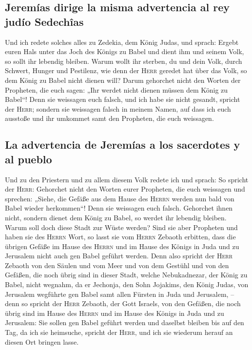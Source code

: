 \hypertarget{jeremuxedas-dirige-la-misma-advertencia-al-rey-juduxedo-sedechuxeeas}{%
\subsection{Jeremías dirige la misma advertencia al rey judío
Sedechîas}\label{jeremuxedas-dirige-la-misma-advertencia-al-rey-juduxedo-sedechuxeeas}}

 Und ich redete solches alles zu Zedekia, dem König
Judas, und sprach: Ergebt euren Hals unter das Joch des Königs zu Babel
und dient ihm und seinem Volk, so sollt ihr lebendig bleiben.
 Warum wollt ihr sterben, du und dein Volk, durch
Schwert, Hunger und Pestilenz, wie denn der \textsc{Herr} geredet hat
über das Volk, so dem König zu Babel nicht dienen will? 
Darum gehorchet nicht den Worten der Propheten, die euch sagen: „Ihr
werdet nicht dienen müssen dem König zu Babel``! Denn sie weissagen euch
falsch,  und ich habe sie nicht gesandt, spricht der
\textsc{Herr}; sondern sie weissagen falsch in meinem Namen, auf dass
ich euch ausstoße und ihr umkommet samt den Propheten, die euch
weissagen.

\hypertarget{la-advertencia-de-jeremuxedas-a-los-sacerdotes-y-al-pueblo}{%
\subsection{La advertencia de Jeremías a los sacerdotes y al
pueblo}\label{la-advertencia-de-jeremuxedas-a-los-sacerdotes-y-al-pueblo}}

 Und zu den Priestern und zu allem diesem Volk redete ich
und sprach: So spricht der \textsc{Herr}: Gehorchet nicht den Worten
eurer Propheten, die euch weissagen und sprechen: „Siehe, die Gefäße aus
dem Hause des \textsc{Herrn} werden nun bald von Babel wieder
herkommen``! Denn sie weissagen euch falsch.  Gehorchet
ihnen nicht, sondern dienet dem König zu Babel, so werdet ihr lebendig
bleiben. Warum soll doch diese Stadt zur Wüste werden? 
Sind sie aber Propheten und haben sie des \textsc{Herrn} Wort, so lasst
sie vom \textsc{Herrn} Zebaoth erbitten, dass die übrigen Gefäße im
Hause des \textsc{Herrn} und im Hause des Königs in Juda und zu
Jerusalem nicht auch gen Babel geführt werden.  Denn also
spricht der \textsc{Herr} Zebaoth von den Säulen und vom Meer und von
dem Gestühl und von den Gefäßen, die noch übrig sind in dieser Stadt,
 welche Nebukadnezar, der König zu Babel, nicht wegnahm,
da er Jechonja, den Sohn Jojakims, den König Judas, von Jerusalem
wegführte gen Babel samt allen Fürsten in Juda und Jerusalem,
 -- denn so spricht der \textsc{Herr} Zebaoth, der Gott
Israels, von den Gefäßen, die noch übrig sind im Hause des
\textsc{Herrn} und im Hause des Königs in Juda und zu Jerusalem:
 Sie sollen gen Babel geführt werden und daselbst bleiben
bis auf den Tag, da ich sie heimsuche, spricht der \textsc{Herr}, und
ich sie wiederum herauf an diesen Ort bringen lasse.

